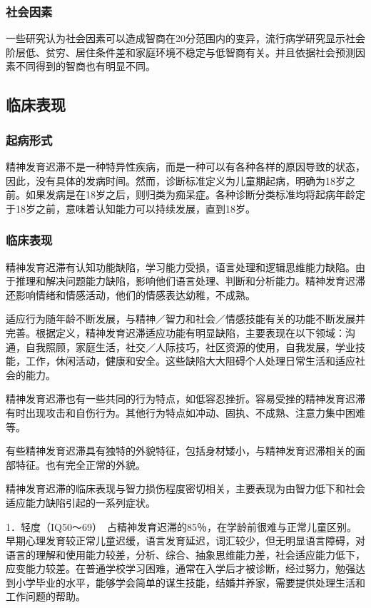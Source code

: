 \subsubsection{社会因素}

一些研究认为社会因素可以造成智商在20分范围内的变异，流行病学研究显示社会阶层低、贫穷、居住条件差和家庭环境不稳定与低智商有关。并且依据社会预测因素不同得到的智商也有明显不同。

\subsection{临床表现}

\subsubsection{起病形式}

精神发育迟滞不是一种特异性疾病，而是一种可以有各种各样的原因导致的状态，因此，没有具体的发病时间。然而，诊断标准定义为儿童期起病，明确为18岁之前。如果发病是在18岁之后，则归类为痴呆症。各种诊断分类标准均将起病年龄定于18岁之前，意味着认知能力可以持续发展，直到18岁。

\subsubsection{临床表现}

精神发育迟滞有认知功能缺陷，学习能力受损，语言处理和逻辑思维能力缺陷。由于推理和解决问题能力缺陷，影响他们语言处理、判断和分析能力。精神发育迟滞还影响情绪和情感活动，他们的情感表达幼稚，不成熟。

适应行为随年龄不断发展，与精神／智力和社会／情感技能有关的功能不断发展并完善。根据定义，精神发育迟滞适应功能有明显缺陷，主要表现在以下领域：沟通，自我照顾，家庭生活，社交／人际技巧，社区资源的使用，自我发展，学业技能，工作，休闲活动，健康和安全。这些缺陷大大阻碍个人处理日常生活和适应社会的能力。

精神发育迟滞也有一些共同的行为特点，如低容忍挫折。容易受挫的精神发育迟滞有时出现攻击和自伤行为。其他行为特点如冲动、固执、不成熟、注意力集中困难等。

有些精神发育迟滞具有独特的外貌特征，包括身材矮小，与精神发育迟滞相关的面部特征。也有完全正常的外貌。

精神发育迟滞的临床表现与智力损伤程度密切相关，主要表现为由智力低下和社会适应能力缺陷引起的一系列症状。

1．轻度（IQ50～69）　占精神发育迟滞的85％，在学龄前很难与正常儿童区别。早期心理发育较正常儿童迟缓，语言发育延迟，词汇较少，但无明显语言障碍，对语言的理解和使用能力较差，分析、综合、抽象思维能力差，社会适应能力低下，应变能力较差。在普通学校学习困难，通常在入学后才被诊断，经过努力，勉强达到小学毕业的水平，能够学会简单的谋生技能，结婚并养家，需要提供处理生活和工作问题的帮助。

